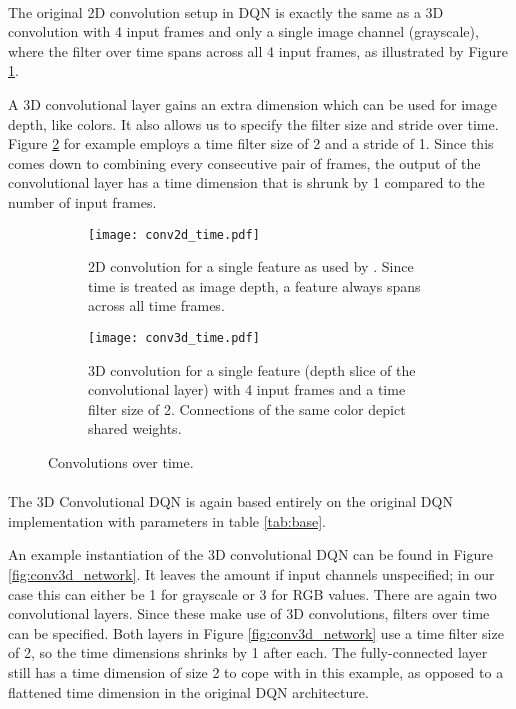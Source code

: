 \paragraph{}
The original 2D convolution setup in DQN
is exactly the same as a 3D convolution
with 4 input frames and only a single image channel (grayscale),
where the filter over time spans across all 4 input frames,
as illustrated by Figure \ref{fig:conv2d_time}.

A 3D convolutional layer gains an extra dimension
which can be used for image depth, like colors.
It also allows us to specify the filter size and stride over time.
Figure \ref{fig:conv3d_time} for example
employs a time filter size of 2 and a stride of 1.
Since this comes down to combining every consecutive pair of frames,
the output of the convolutional layer has a time dimension
that is shrunk by 1 compared to the number of input frames.

\begin{figure}[!htpb]
  \begin{subfigure}[t]{.45\textwidth}
    \centering
    \texttt{[image: conv2d\_time.pdf]}
    \caption{
      2D convolution for a single feature as used by \cite{Mnih2013}.
      Since time is treated as image depth,
      a feature always spans across all time frames.
    }
    \label{fig:conv2d_time}
  \end{subfigure}
  \hfill
  \begin{subfigure}[t]{.45\textwidth}
    \centering
    \texttt{[image: conv3d\_time.pdf]}
    \caption{
      3D convolution for a single feature
      (depth slice of the convolutional layer)
      with 4 input frames
      and a time filter size of 2.
      Connections of the same color depict shared weights.
    }
    \label{fig:conv3d_time}
  \end{subfigure}
  \caption{
    Convolutions over time.
  }
  \label{fig:conv3d}
\end{figure}

\paragraph{}
The 3D Convolutional DQN
is again based entirely on the original DQN implementation
with parameters in table \ref{tab:base}.

An example instantiation of the 3D convolutional DQN
can be found in Figure \ref{fig:conv3d_network}.
It leaves the amount if input channels unspecified;
in our case this can either be 1 for grayscale
or 3 for RGB values.
There are again two convolutional layers.
Since these make use of 3D convolutions,
filters over time can be specified.
Both layers in Figure \ref{fig:conv3d_network}
use a time filter size of 2,
so the time dimensions shrinks by 1 after each.
The fully-connected layer
still has a time dimension of size 2 to cope with in this example,
as opposed to a flattened time dimension in the original DQN architecture.

